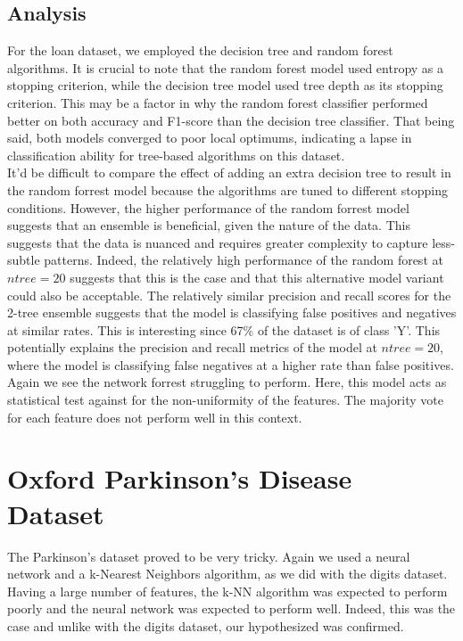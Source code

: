 \documentclass{article}
\begin{document}
\subsection*{Analysis}
For the loan dataset, we employed the decision tree and random forest algorithms.
It is crucial to note that the random forest model used entropy as a stopping criterion,
while the decision tree model used tree depth as its stopping criterion.
This may be a factor in why the random forest classifier performed better on both accuracy and F1-score
than the decision tree classifier.
That being said, both models converged to poor local optimums, 
indicating a lapse in classification ability for tree-based algorithms on this dataset.
\\

It'd be difficult to compare the effect of adding an extra decision tree to result in the random forrest model because the algorithms are tuned to different stopping conditions.
However, the higher performance of the random forrest model suggests that an ensemble is beneficial, given the nature of the data. This suggests that the data is nuanced and requires greater complexity to capture 
less-subtle patterns. Indeed, the relatively high performance of the random forest at $ntree=20$ suggests that this is the case and that this alternative model variant could also be acceptable.
The relatively similar precision and recall scores for the 2-tree ensemble suggests that the model is classifying false positives and negatives at similar rates. This is interesting since 67\% of the dataset is of class 'Y'.
This potentially explains the precision and recall metrics of the model at $ntree=20$, where the model is classifying false negatives at a higher rate than false positives.
\\

Again we see the network forrest struggling to perform. Here, this model acts as statistical test against for the non-uniformity of the features. 
The majority vote for each feature does not perform well in this context.

\newpage
\section*{Oxford Parkinson's Disease Dataset}
The Parkinson's dataset proved to be very tricky. Again we used a neural network and a k-Nearest Neighbors algorithm, as we did with the digits dataset.
Having a large number of features, the k-NN algorithm was expected to perform poorly and the neural network was expected to perform well.
Indeed, this was the case and unlike with the digits dataset, our hypothesized was confirmed.
\\
\end{document}
